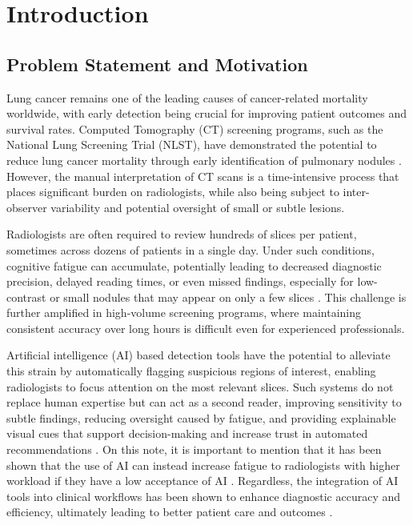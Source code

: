 \chapter{Introduction}
\label{ch:introduction}

\section{Problem Statement and Motivation}

Lung cancer remains one of the leading causes of cancer-related mortality worldwide, with early detection being crucial for improving patient outcomes and survival rates. Computed Tomography (CT) screening programs, such as the National Lung Screening Trial (NLST), have demonstrated the potential to reduce lung cancer mortality through early identification of pulmonary nodules \cite{aberle2011reduced, de2020reduced}. However, the manual interpretation of CT scans is a time-intensive process that places significant burden on radiologists, while also being subject to inter-observer variability and potential oversight of small or subtle lesions.

Radiologists are often required to review hundreds of slices per patient, sometimes across dozens of patients in a single day. Under such conditions, cognitive fatigue can accumulate, potentially leading to decreased diagnostic precision, delayed reading times, or even missed findings, especially for low-contrast or small nodules that may appear on only a few slices \cite{stec2018systematic, taylor2019fatigue}. This challenge is further amplified in high-volume screening programs, where maintaining consistent accuracy over long hours is difficult even for experienced professionals.

Artificial intelligence (AI) based detection tools have the potential to alleviate this strain by automatically flagging suspicious regions of interest, enabling radiologists to focus attention on the most relevant slices. Such systems do not replace human expertise but can act as a second reader, improving sensitivity to subtle findings, reducing oversight caused by fatigue, and providing explainable visual cues that support decision-making and increase trust in automated recommendations \cite{glikson2020human}. 
On this note, it is important to mention that it has been shown that the use of AI can instead increase fatigue to radiologists with higher workload if they have a low acceptance of AI \cite{liu2024artificial}. Regardless, the integration of AI tools into clinical workflows has been shown to enhance diagnostic accuracy  and efficiency, ultimately leading to better patient care and outcomes \cite{guermazi2022improving,huynh2020artificial}.

